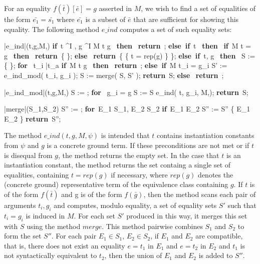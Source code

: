 \documentclass{llncs}
\def\IF{\qtab\keyword{if}\ }
\def\THEN{\ \keyword{then}\ }
\def\ELSE{\untab\qtab\keyword{else}\ }
\def\ELSEIF{\untab\qtab\keyword{else if}\ }
\def\FI{\untab}
\def\RETURN{\keyword{return}\ }
\def\ENDPROC{\untab}
\def\DOFOR{\qtab\keyword{for}\ }
\def\ENDFOR{\untab}
\def\keyword#1{\mbox{\normalshape\bf #1}}
\begin{document}
For an equality $f( \bar{t} )[\bar{e}] = g$ asserted in $M$, we wish to find a set of equalities of the form $\bar{e_1} = \bar{s_1}$ where $\bar{e_1}$ is a subset of $\bar{e}$ that are sufficient for showing this equality.
The following method $e\_ind$ computes a set of such equality sets:

\begin{minipage}[t]{.4\linewidth}
\begin{program}
\PROC |e\_ind|(t,g,M,\psi) \BODY
  \IF t \not\mapsto^I \psi, g \not\mapsto^I \emptyset {} M \models t \neq g \THEN
    \RETURN \emptyset;
  \ELSEIF t  \THEN
    \IF M \models t = g \THEN
      \RETURN \{ \emptyset \};
    \ELSE
      \RETURN \{ \{ t = rep(g) \} \};
    \FI
  \ELSEIF t, g  \THEN
    S := \{ \emptyset \};
    \DOFOR {} t_i  \bar{t_a} 
      \IF M \models t \neq g \THEN
        \RETURN \emptyset;
      \ELSEIF M \not\models t_i = g_i
        S' := e\_ind\_mod( t_i, g_i );
        S := merge( S, S' );
      \FI
    \ENDFOR
    \RETURN S;
  \ELSE
    \RETURN \emptyset;
  \FI
\ENDPROC
\end{program}
\end{minipage}
\begin{minipage}[t]{.4\linewidth}
\begin{program}
\PROC |e\_ind\_mod|(t,g,M,\psi) \BODY
  S := \emptyset;
  \DOFOR {} g_i = g
    S := S \cup e\_ind( t, g_i, M,\psi );
  \ENDFOR
  \RETURN S;
\ENDPROC
\end{program}
\begin{program}
\PROC |merge|(S_1,S_2) \BODY
  S'' := \emptyset;
  \DOFOR E_1 \in S_1, E_2 \in S_2
    \IF E_1  E_2 
      S'' := S'' \cup \{ E_1 \cup E_2 \}
    \FI
  \ENDFOR
  \RETURN S'';
\ENDPROC
\end{program}
\end{minipage}

The method $e\_ind(t,g,M,\psi)$ is intended that $t$ contains instantiation constants from $\psi$ and $g$ is a concrete ground term.
If these preconditions are not met or if $t$ is disequal from $g$, the method returns the empty set.
In the case that $t$ is an instantiation constant, the method returns the set containg a single set of equalities, containing $t = rep( g )$ if necessary, where $rep( g )$ denotes the (concrete ground) representative term of the equivalence class containing $g$.
If $t$ is of the form $f(\bar{t})$ and g is of the form $f(\bar{g})$, then the method scans each pair of arguments $t_i, g_i$ and computes, modulo equality, a set of equality sets $S'$ such that $t_i = g_i$ is induced in $M$.
For each set $S'$ produced in this way, it merges this set with $S$ using the method $merge$.
This method pairwise combines $S_1$ and $S_2$ to form the set $S''$.
For each pair $E_1 \in S_1$, $E_2 \in S_2$, if $E_1$ and $E_2$ are compatible, that is, there does not exist an equality $e = t_1$ in $E_1$ and $e = t_2$ in $E_2$ and $t_1$ is not syntactically equivalent to $t_2$, then the union of $E_1$ and $E_2$ is added to $S''$.
\end{document}
